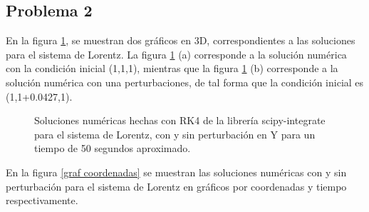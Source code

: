 \documentclass[letterpaper,oneside]{article}
\begin{document}
\subsection{Problema 2}
En la figura \ref{graf 3D}, se muestran dos gráficos en 3D, correspondientes a las soluciones para el sistema de Lorentz. La figura \ref{graf 3D} (a) corresponde a la solución numérica con la condición inicial (1,1,1), mientras que la figura \ref{graf 3D} (b) corresponde a la solución numérica con una perturbaciones, de tal forma que la condición inicial es (1,1+0.0427,1).
\begin{figure}\centering
{}\hfill
{}
\caption{Soluciones numéricas hechas con RK4 de la librería scipy-integrate para el sistema de Lorentz, con y sin perturbación en Y para un tiempo de 50 segundos aproximado.}
\label{graf 3D}
\end{figure}
En la figura \ref{graf coordenadas} se muestran las soluciones numéricas con y sin perturbación para el sistema de Lorentz en gráficos por coordenadas y tiempo respectivamente.
\end{document}

